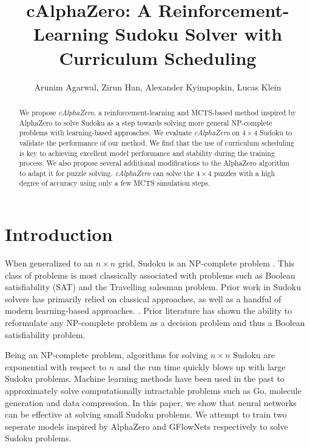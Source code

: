 \documentclass[10pt, reqno, letterpaper, twoside]{amsart}
\title{cAlphaZero: A Reinforcement-Learning Sudoku Solver with Curriculum Scheduling}
\author{
Arunim Agarwal,
Zirun Han,
Alexander Kyimpopkin,
Lucas Klein
}
\begin{document}
\begin{abstract}
We propose \textit{cAlphaZero}, a reinforcement-learning and MCTS-based method inspired by AlphaZero to solve Sudoku as a step towards solving more general NP-complete problems with learning-based approaches.   We evaluate \textit{cAlphaZero} on $4 \times 4$ Sudoku to validate the performance of our method.  We find that the use of curriculum scheduling is key to achieving excellent model performance and stability during the training process. We also propose several additional modifications to the AlphaZero algorithm to adapt it for puzzle solving. \textit{cAlphaZero} can solve the $4 \times 4$ puzzles with a high degree of accuracy using only a few MCTS simulation steps. 
\end{abstract}

\maketitle

\section{Introduction}
When generalized to an $n \times n $ grid, Sudoku is an NP-complete problem \cite{yato2003complexity}.  This class of problems is most classically associated with problems such as Boolean satisfiability (SAT) and the Travelling salesman problem.  Prior work in Sudoku solvers has primarily relied on classical approaches, as well as a handful of modern learning-based approaches. \cite{mehta2021reinforcement}.  Prior literature has shown the ability to reformulate any NP-complete problem as a decision problem and thus a Boolean satisfiability problem.

Being an NP-complete problem, algorithms for solving $n\times n$ Sudoku are exponential with respect to $n$ and the run time quickly blows up with large Sudoku problems. Machine learning methods have been used in the past to approximately solve computationally intractable problems such as Go, molecule generation and data compression. \cite{Silver2018}\cite{bengio2021flow}\cite{yang2023introduction} In this paper, we show that neural networks can be effective at solving small Sudoku problems. We attempt to train two seperate models inspired by AlphaZero and GFlowNets respectively to solve Sudoku problems.
\end{document}
